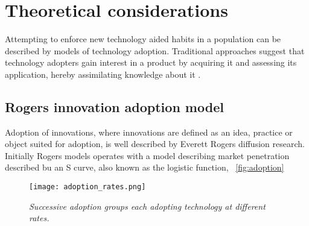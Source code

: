 \documentclass[journal]{IEEEtran}
\begin{document}
\section{Theoretical considerations}
Attempting to enforce new technology aided habits in a population can be described by models of technology adoption. 
Traditional approaches suggest that technology adopters gain interest in a product by acquiring it and assessing its application, hereby assimilating knowledge about it \cite{gilbert}.

\subsection{Rogers innovation adoption model}
Adoption of innovations, where innovations are defined as an idea, practice or object suited for adoption, is well described by Everett Rogers diffusion research.
Initially Rogers models \cite{rogers_model} operates with a model describing market penetration described bu an S curve, also known as the logistic function, ~\ref{fig:adoption}


\begin{figure}
\texttt{[image: adoption\_rates.png]}
\caption{\textit{Successive adoption groups each adopting technology at different rates.}}			
\end{figure}
\label{fig:adoption} %
\end{document}
